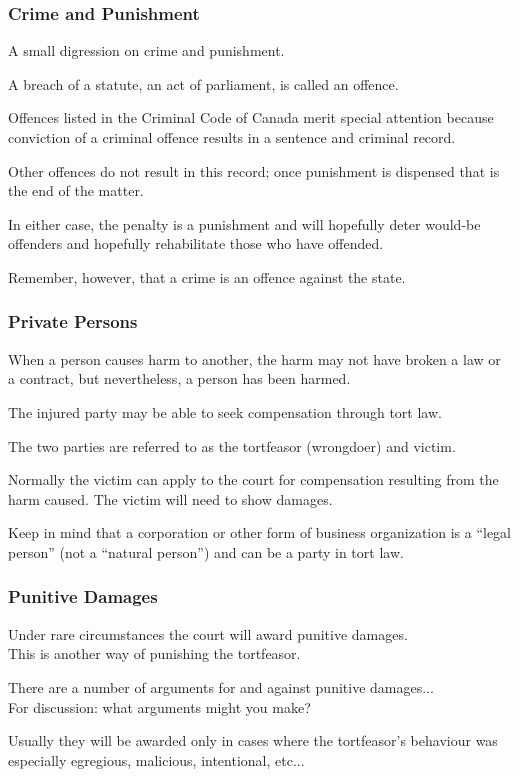 \begin{frame}
\frametitle{Crime and Punishment}

A small digression on crime and punishment. 

A breach of a statute, an act of parliament, is called an \alert{offence}.

Offences listed in the Criminal Code of Canada merit special attention because conviction of a criminal offence results in a sentence and criminal record.

Other offences do not result in this record; once punishment is dispensed that is the end of the matter.

In either case, the penalty is a punishment and will hopefully deter would-be offenders and hopefully rehabilitate those who have offended.

Remember, however, that a crime is an offence against the state.

\end{frame}



\begin{frame}
\frametitle{Private Persons}

When a person causes harm to another, the harm may not have broken a law or a contract, but nevertheless, a person has been harmed.

The injured party may be able to seek compensation through tort law.

The two parties are referred to as the \alert{tortfeasor} (wrongdoer) and \alert{victim}.

Normally the victim can apply to the court for compensation resulting from the harm caused. The victim will need to show damages.

Keep in mind that a corporation or other form of business organization is a ``legal person'' (not a ``natural person'') and can be a party in tort law.

\end{frame}



\begin{frame}
\frametitle{Punitive Damages}

Under rare circumstances the court will award \alert{punitive damages}.\\
\quad This is another way of punishing the tortfeasor.

There are a number of arguments for and against punitive damages...\\
\quad For discussion: what arguments might you make?

Usually they will be awarded only in cases where the tortfeasor's behaviour was especially egregious, malicious, intentional, etc...

\end{frame}



